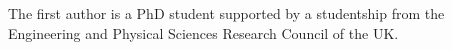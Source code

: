 \documentclass[preprint]{sigplanconf}
\begin{document}
\begin{comment}
isDeptD :: Name -> Dept -> Bool
isDeptD n (D n2 _ _) = n==n2
</pre>
<pre class="compos">
incrOne :: Name -> Float -> Tree c -> Tree c
incrOne d k c = case c of
    D n _ _ | n == d -> increase k c
    _ -> composOp (incrOne d k) c
</pre>
<pre class="play">
incrOne :: PlayEx x Dept => String -> Float -> x -> x
incrOne name k = mapUnderEx (\d@(D n _ _) -> if name == n then increase k d else d)
</pre>
<p>
    Here SYB has grown substantially more complex, to accomodate the invariant, requiring two different utility functions. Compos still retains the same structure as before, requiring a case to distinguish between the types of constructor. Play remains shorter - although in this case the complexity is roughly the same as the Compos solution.
</p>

<h3>The <tt>salaryBill</tt> function</h3>

<pre class="syb">
salaryBill :: Company -> Float
salaryBill = everything (+) (0 `mkQ` billS)

billS :: Salary -> Float
billS (S f) = f
</pre>
<pre class="compos">
salaryBill :: Tree c -> Float
salaryBill c = case c of
    S s -> s
    _ -> composOpFold 0 (+) salaryBill c
</pre>
<pre class="play">
salaryBill :: PlayEx x Salary => x -> Float
salaryBill x = sum [x | S x <- allOverEx x]
</pre>
<p>
    Here the Play instance wins by being able to use a list comprehension to select the salary value out of a Salary object. The Play class is the only one that is able to use the standard Haskell <tt>sum</tt> function, not requiring an explicit fold to be performed. In this case it could easily be argued that <tt>billS</tt> is probably a general function, so the cost of writting it is not really correctly attributed to the SYB approach. If <tt>billS</tt> is a generally defined function, then you can rewrite the Play example as:
</p>
<pre class="play">
salaryBill2 :: PlayEx x Salary => x -> Float
salaryBill2 = sum . map billS . allOverEx
</pre>
<p>
    This solution is nice in that it is a very specification orientated view of the problem. Take all the salaries, get their value, and sum them.
</p>



%
\end{comment}
\acks

The first author is a PhD student supported by a studentship from the Engineering and Physical Sciences Research Council of the UK.




\end{document}
